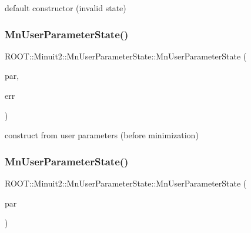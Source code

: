 default constructor (invalid state) 

\mbox{\label{classROOT_1_1Minuit2_1_1MnUserParameterState_a75f83d5752afc69f1e55838f8446880a}} 
\subsubsection{\texorpdfstring{MnUserParameterState()}{MnUserParameterState()}\hspace{0.1cm}{\footnotesize\ttfamily [2/16]}}
{\footnotesize\ttfamily R\+O\+O\+T\+::\+Minuit2\+::\+Mn\+User\+Parameter\+State\+::\+Mn\+User\+Parameter\+State (\begin{DoxyParamCaption}\item[{const std\+::vector$<$ double $>$ \&}]{par,  }\item[{const std\+::vector$<$ double $>$ \&}]{err }\end{DoxyParamCaption})}



construct from user parameters (before minimization) 

\mbox{\label{classROOT_1_1Minuit2_1_1MnUserParameterState_aa4a32c2e51a89c2feca7a376972f1ff5}} 
\subsubsection{\texorpdfstring{MnUserParameterState()}{MnUserParameterState()}\hspace{0.1cm}{\footnotesize\ttfamily [3/16]}}
{\footnotesize\ttfamily R\+O\+O\+T\+::\+Minuit2\+::\+Mn\+User\+Parameter\+State\+::\+Mn\+User\+Parameter\+State (\begin{DoxyParamCaption}\item[{const \mbox{\hyperlink{classROOT_1_1Minuit2_1_1MnUserParameters}{Mn\+User\+Parameters}} \&}]{par }\end{DoxyParamCaption})}

